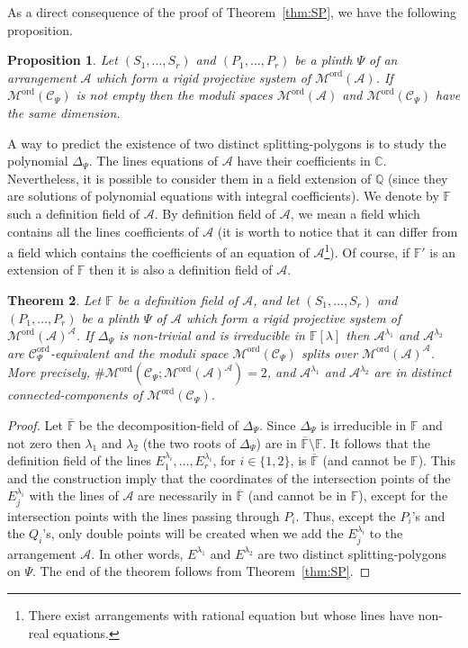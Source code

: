 \documentclass[11pt, a4paper]{amsart}
\newtheorem{theorem}{Theorem}[section]
\newtheorem{proposition}[theorem]{Proposition}
\theoremstyle{definition}
\theoremstyle{remark}
\newcommand{\CC}{\mathds{C}}
\newcommand{\QQ}{\mathds{Q}}
\newcommand{\FF}{\mathds{F}}
\newcommand{\A}{\mathcal{A}}
\newcommand{\C}{\mathcal{C}}
\newcommand{\M}{\mathcal{M}}
\newcommand{\ord}{\text{ord}}
\begin{document}
As a direct consequence of the proof of Theorem~\ref{thm:SP}, we have the following proposition.

\begin{proposition}\label{prop:dimension}
	Let $(S_1,\dots,S_r)$ and $(P_1,\dots,P_r)$ be a plinth $\Psi$ of an arrangement $\A$ which form a rigid projective system of  $\M^\ord(\A)$. If $\M^\ord(\C_\Psi)$ is not empty then the moduli spaces $\M^\ord(\A)$ and $\M^\ord(\C_\Psi)$ have the same dimension.
\end{proposition}

A way to predict the existence of two distinct splitting-polygons is to study the polynomial $\Delta_{\Psi}$. The lines equations of $\A$ have their coefficients in $\CC$. Nevertheless, it is possible to consider them in a field extension of $\QQ$ (since they are solutions of polynomial equations with integral coefficients). We denote by $\FF$ such a definition field of $\A$. By definition field of $\A$, we mean a field which contains all the lines coefficients of $\A$ (it is worth to notice that it can differ from a field which contains the coefficients of an equation of $\A$\footnote{There exist arrangements with rational equation but whose lines have non-real equations.}). Of course, if $\FF'$ is an extension of $\FF$ then it is also a definition field of $\A$. 

\begin{theorem}\label{thm:irreducible}
	Let $\FF$ be a definition field of $\A$, and let $(S_1,\dots,S_r)$ and $(P_1,\dots,P_r)$ be a plinth $\Psi$ of $\A$ which form a rigid projective system of  $\M^\ord(\A)^\A$.  If $\Delta_{\Psi}$ is non-trivial and is irreducible in $\FF[\lambda]$ then $\A^{\lambda_1}$ and $\A^{\lambda_2}$ are $\C^\ord_\Psi$-equivalent and the moduli space $\M^\ord(\C_\Psi)$ splits over $\M^\ord(\A)^\A$. More precisely, $\# \M^\ord(\C_\Psi;\M^\ord(\A)^\A) =2$, and $\A^{\lambda_1}$ and $\A^{\lambda_2}$ are in distinct connected-components of $\M^\ord(\C_\Psi)$.
\end{theorem}

\begin{proof}
	Let $\overline{\FF}$ be the decomposition-field of $\Delta_{\Psi}$. Since $\Delta_{\Psi}$ is irreducible in $\FF$ and not zero then $\lambda_1$ and $\lambda_2$ (the two roots of $\Delta_{\Psi}$) are in $\overline{\FF}\setminus\FF$. It follows that the definition field of the lines $E^{\lambda_i}_1,\dots,E^{\lambda_i}_r$, for $i\in\{1,2\}$, is $\overline{\FF}$ (and cannot be $\FF$). This and the construction imply that the coordinates of the intersection points of the $E^{\lambda_i}_j$ with the lines of $\A$ are necessarily in $\overline{\FF}$ (and cannot be in $\FF$), except for the intersection points with the lines passing through $P_i$. Thus, except the $P_i$'s and the $Q_i$'s, only double points will be created when we add the $E^{\lambda_i}_j$ to the arrangement $\A$. In other words, $E^{\lambda_1}$ and $E^{\lambda_2}$ are two distinct splitting-polygons on $\Psi$. The end of the theorem follows from Theorem~\ref{thm:SP}.
\end{proof}
\end{document}
